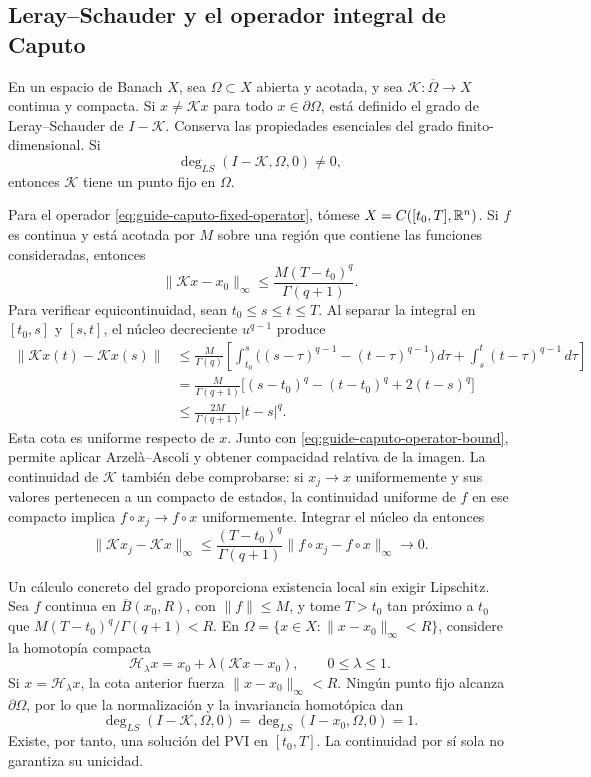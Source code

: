 \subsection{Leray--Schauder y el operador integral de Caputo}

En un espacio de Banach $X$, sea $\Omega\subset X$ abierta y acotada, y sea
$\mathcal K:\overline\Omega\to X$ continua y compacta. Si
$x\ne\mathcal Kx$ para todo $x\in\partial\Omega$, está definido el grado de
Leray--Schauder de $I-\mathcal K$. Conserva las propiedades esenciales del
grado finito-dimensional. Si
\[
 \deg_{LS}(I-\mathcal K,\Omega,0)\neq0,
\]
entonces $\mathcal K$ tiene un punto fijo en $\Omega$.

Para el operador \eqref{eq:guide-caputo-fixed-operator}, tómese
$X=C([t_0,T],\mathbb{R}^n)$. Si $f$ es continua y está acotada por $M$ sobre una región
que contiene las funciones consideradas, entonces
\begin{equation}
 \|\mathcal Kx-x_0\|_\infty
 \leq \frac{M(T-t_0)^q}{\Gamma(q+1)}.
 \label{eq:guide-caputo-operator-bound}
\end{equation}
Para verificar equicontinuidad, sean \(t_0\le s\le t\le T\).
Al separar la integral en \([t_0,s]\) y \([s,t]\), el núcleo decreciente
\(u^{q-1}\) produce
\begin{align*}
 \|\mathcal Kx(t)-\mathcal Kx(s)\|
 &\le\frac M{\Gamma(q)}\left[
 \int_{t_0}^{s}\bigl((s-\tau)^{q-1}-(t-\tau)^{q-1}\bigr)\,d\tau
 +\int_s^t(t-\tau)^{q-1}\,d\tau\right]\\
 &=\frac M{\Gamma(q+1)}
 \bigl[(s-t_0)^q-(t-t_0)^q+2(t-s)^q\bigr]\\
 &\le\frac{2M}{\Gamma(q+1)}|t-s|^q.
\end{align*}
Esta cota es uniforme respecto de \(x\). Junto con
\eqref{eq:guide-caputo-operator-bound}, permite aplicar Arzelà--Ascoli
y obtener compacidad relativa de la imagen. La continuidad de
\(\mathcal K\) también debe comprobarse: si \(x_j\to x\) uniformemente
y sus valores pertenecen a un compacto de estados, la continuidad uniforme
de \(f\) en ese compacto implica \(f\circ x_j\to f\circ x\)
uniformemente. Integrar el núcleo da entonces
\[
 \|\mathcal Kx_j-\mathcal Kx\|_\infty
 \le\frac{(T-t_0)^q}{\Gamma(q+1)}
 \|f\circ x_j-f\circ x\|_\infty\longrightarrow0.
\]

Un cálculo concreto del grado proporciona existencia local sin exigir
Lipschitz. Sea \(f\) continua en \(\overline B(x_0,R)\), con
\(\|f\|\le M\), y tome \(T>t_0\) tan próximo a \(t_0\) que
\(M(T-t_0)^q/\Gamma(q+1)<R\). En
\(\Omega=\{x\in X:\|x-x_0\|_\infty<R\}\), considere la homotopía
compacta
\[
 \mathcal H_\lambda x=x_0+\lambda(\mathcal Kx-x_0),
 \qquad 0\le\lambda\le1.
\]
Si \(x=\mathcal H_\lambda x\), la cota anterior fuerza
\(\|x-x_0\|_\infty<R\). Ningún punto fijo alcanza
\(\partial\Omega\), por lo que la normalización y la invariancia
homotópica dan
\[
 \deg_{LS}(I-\mathcal K,\Omega,0)
 =\deg_{LS}(I-x_0,\Omega,0)=1.
\]
Existe, por tanto, una solución del PVI en \([t_0,T]\). La continuidad
por sí sola no garantiza su unicidad.

